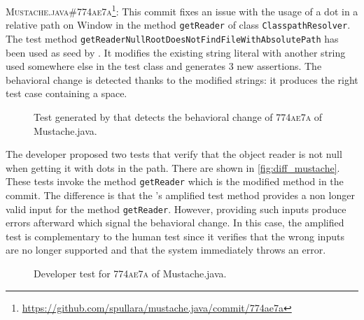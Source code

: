 \textsc{Mustache.java\#774ae7a}\footnote{\url{https://github.com/spullara/mustache.java/commit/774ae7a}}: This commit fixes an issue with the usage of a dot in a relative path on Window in the method \texttt{getReader} of class \texttt{ClasspathResolver}.
The test method \texttt{getReaderNullRootDoesNotFindFileWithAbsolutePath} has been used as seed by \DCI.
It modifies the existing string literal with another string used somewhere else in the test class and generates 3 new assertions.
The behavioral change is detected thanks to the modified strings: it produces the right test case containing a space.

\begin{figure}[h]
\centering
{}
\caption{Test generated by \DCII that detects the behavioral change of \textsc{774ae7a} of Mustache.java.}
\label{fig:ampl_mustache}
\end{figure}

The developer proposed two tests that verify that the object reader is not null when getting it with dots in the path.
There are shown in \autoref{fig:diff_mustache}.
These tests invoke the method \texttt{getReader} which is the modified method in the commit.
%
The difference is that the \DCII's amplified test method provides a non longer valid input for the method \texttt{getReader}.
However, providing such inputs produce errors afterward which signal the behavioral change.
In this case, the amplified test is complementary to the human test since it verifies that the wrong inputs are no longer supported and that the system immediately throws an error.

\begin{figure}[h]
\centering
{}
\caption{Developer test for \textsc{774ae7a} of Mustache.java.}
\label{fig:diff_mustache}
\end{figure}


